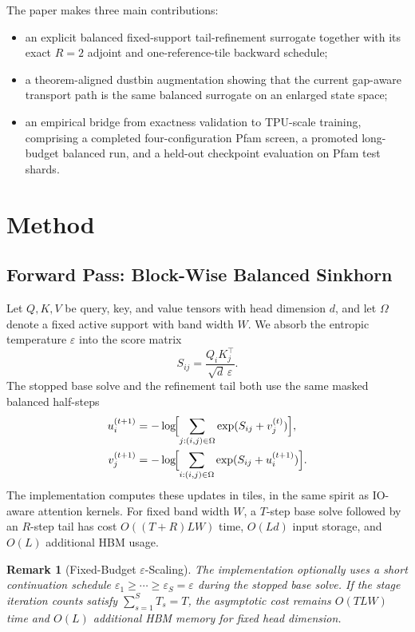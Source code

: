 \documentclass{article}
\newtheorem{remark}{Remark}
\begin{document}
The paper makes three main contributions:
\begin{itemize}
    \item an explicit balanced fixed-support tail-refinement surrogate together with its exact $R=2$ adjoint and one-reference-tile backward schedule;
    \item a theorem-aligned dustbin augmentation showing that the current gap-aware transport path is the same balanced surrogate on an enlarged state space;
    \item an empirical bridge from exactness validation to TPU-scale training, comprising a completed four-configuration Pfam screen, a promoted long-budget balanced run, and a held-out checkpoint evaluation on Pfam test shards.
\end{itemize}

\section{Method}

\subsection{Forward Pass: Block-Wise Balanced Sinkhorn}

Let $Q,K,V$ be query, key, and value tensors with head dimension $d$, and let $\Omega$ denote a fixed active support with band width $W$. We absorb the entropic temperature $\varepsilon$ into the score matrix
\[
S_{ij} = \frac{Q_i K_j^\top}{\sqrt{d}\,\varepsilon}.
\]
The stopped base solve and the refinement tail both use the same masked balanced half-steps
\begin{align}
    u_i^{(t+1)} &= -\log\!\Bigl[\sum_{j:(i,j)\in\Omega} \exp(S_{ij} + v_j^{(t)})\Bigr], \\
    v_j^{(t+1)} &= -\log\!\Bigl[\sum_{i:(i,j)\in\Omega} \exp(S_{ij} + u_i^{(t+1)})\Bigr].
\end{align}
The implementation computes these updates in tiles, in the same spirit as IO-aware attention kernels. For fixed band width $W$, a $T$-step base solve followed by an $R$-step tail has cost $O((T+R)LW)$ time, $O(Ld)$ input storage, and $O(L)$ additional HBM usage.

\begin{remark}[Fixed-Budget \texorpdfstring{$\varepsilon$}{epsilon}-Scaling]
The implementation optionally uses a short continuation schedule $\varepsilon_1 \ge \cdots \ge \varepsilon_S = \varepsilon$ during the stopped base solve. If the stage iteration counts satisfy $\sum_{s=1}^{S} T_s = T$, the asymptotic cost remains $O(TLW)$ time and $O(L)$ additional HBM memory for fixed head dimension.
\end{remark}
\end{document}
